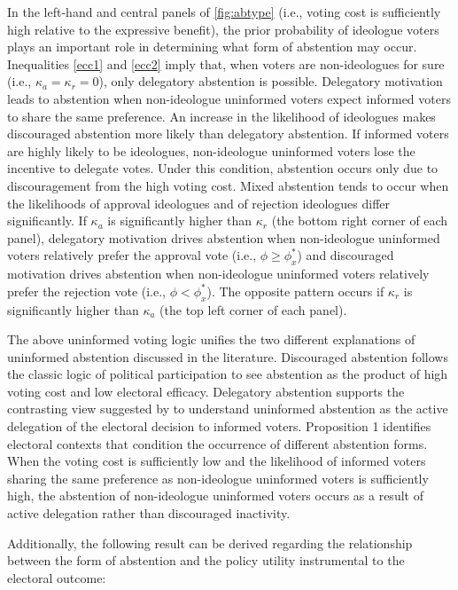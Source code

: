 \documentclass[doc,natbib,12pt]{apa6}
\begin{document}
	\par In the left-hand and central panels of \autoref{fig:abtype} (i.e., voting cost is sufficiently high relative to the expressive benefit), the prior probability of ideologue voters plays an important role in determining what form of abstention may occur. Inequalities \ref{ecc1} and \ref{ecc2} imply that, when voters are non-ideologues for sure (i.e., $\kappa_{a} = \kappa_{r} = 0$), only delegatory abstention is possible. Delegatory motivation leads to abstention when non-ideologue uninformed voters expect informed voters to share the same preference. An increase in the likelihood of ideologues makes discouraged abstention more likely than delegatory abstention. If informed voters are highly likely to be ideologues, non-ideologue uninformed voters lose the incentive to delegate votes. Under this condition, abstention occurs only due to discouragement from the high voting cost. Mixed abstention tends to occur when the likelihoods of approval ideologues and of rejection ideologues differ significantly. If $\kappa_a$ is significantly higher than $\kappa_r$ (the bottom right corner of each panel), delegatory motivation drives abstention when non-ideologue uninformed voters relatively prefer the approval vote (i.e., $\phi \geq \phi^*_x$) and discouraged motivation drives abstention when non-ideologue uninformed voters relatively prefer the rejection vote (i.e., $\phi < \phi^*_x$). The opposite pattern occurs if $\kappa_r$ is significantly higher than $\kappa_a$ (the top left corner of each panel).
	
	\par The above uninformed voting logic unifies the two different explanations of uninformed abstention discussed in the literature. Discouraged abstention follows the classic logic of political participation \citep{Downs1957anec} to see abstention as the product of high voting cost and low electoral efficacy. Delegatory abstention supports the contrasting view suggested by \cite{Feddersen1996thsw} to understand uninformed abstention as the active delegation of the electoral decision to informed voters. Proposition 1 identifies electoral contexts that condition the occurrence of different abstention forms. When the voting cost is sufficiently low and the likelihood of informed voters sharing the same preference as non-ideologue uninformed voters is sufficiently high, the abstention of non-ideologue uninformed voters occurs as a result of active delegation rather than discouraged inactivity.
	
	\par Additionally, the following result can be derived regarding the relationship between the form of abstention and the policy utility instrumental to the electoral outcome:
	
\end{document}

